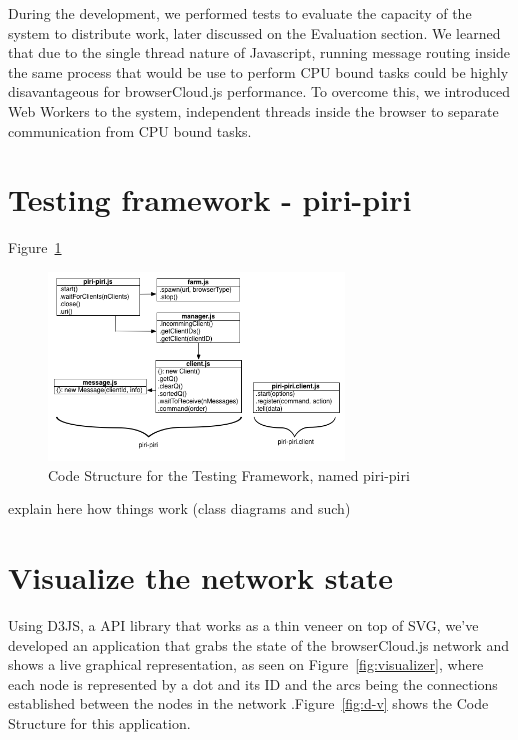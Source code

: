 During the development, we performed tests to evaluate the capacity of the system to distribute work, later discussed on the Evaluation section. We learned that due to the single thread nature of Javascript, running message routing inside the same process that would be use to perform CPU bound tasks could be highly disavantageous for browserCloud.js performance. To overcome this, we introduced Web Workers to the system, independent threads inside the browser to separate communication from CPU bound tasks.

\section{Testing framework - piri-piri}

Figure~\ref{fig:d-p-p}

\begin{figure}[h!]
  \centering
  \includegraphics[width=0.7\textwidth]{figs/diagram-piri-piri}
  \caption{Code Structure for the Testing Framework, named piri-piri}
  \label{fig:d-p-p}
\end{figure}

explain here how things work (class diagrams and such)

\section{Visualize the network state}

Using D3JS, a API library that works as a thin veneer on top of SVG, we've developed an application that grabs the state of the browserCloud.js network and shows a live graphical representation, as seen on Figure~\ref{fig:visualizer}, where each node is represented by a dot and its ID and the arcs being the connections established between the nodes in the network .Figure~\ref{fig:d-v} shows the Code Structure for this application.

